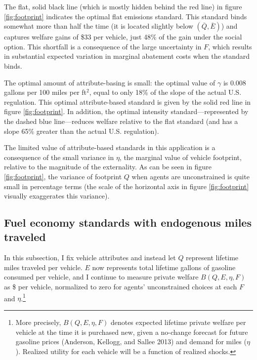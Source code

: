 \documentclass[12pt]{article}
\begin{document}
The flat, solid black line (which is mostly hidden behind the red line) in figure \ref{fig:footprint} indicates the optimal flat emissions standard. This standard binds somewhat more than half the time (it is located slightly below $(\bar{Q},\bar{E})$) and captures welfare gains of \$33 per vehicle, just 48\% of the gain under the social option. This shortfall is a consequence of the large uncertainty in $F$, which results in substantial expected variation in marginal abatement costs when the standard binds.

The optimal amount of attribute-basing is small: the optimal value of $\gamma$ is 0.008 gallons per 100 miles per ft$^2$, equal to only 18\% of the slope of the actual U.S. regulation. This optimal attribute-based standard is given by the solid red line in figure \ref{fig:footprint}. In addition, the optimal intensity standard---represented by the dashed blue line---reduces welfare relative to the flat standard (and has a slope 65\% greater than the actual U.S. regulation). 

The limited value of attribute-based standards in this application is a consequence of the small variance in $\eta$, the marginal value of vehicle footprint, relative to the magnitude of the externality. As can be seen in figure \ref{fig:footprint}, the variance of footprint $Q$ when agents are unconstrained is quite small in percentage terms (the scale of the horizontal axis in figure \ref{fig:footprint} visually exaggerates this variance). 



\subsection{Fuel economy standards with endogenous miles traveled} \label{sec:vmt}
In this subsection, I fix vehicle attributes and instead let $Q$ represent lifetime miles traveled per vehicle. $E$ now represents total lifetime gallons of gasoline consumed per vehicle, and I continue to measure private welfare $B(Q,E,\eta,F)$ as \$ per vehicle, normalized to zero for agents' unconstrained choices at each $F$ and $\eta$.\footnote{More precisely, $B(Q,E,\eta,F)$ denotes expected lifetime private welfare per vehicle at the time it is purchased new, given a no-change forecast for future gasoline prices (Anderson, Kellogg, and Sallee 2013) and demand for miles ($\eta$). Realized utility for each vehicle will be a function of realized shocks.}
\end{document}
